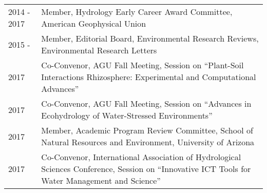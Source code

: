 
\begin{supertabular}{lp{15cm}} 
2014 - 2017 & Member, Hydrology Early Career Award Committee, American Geophysical Union \\
2015 -  & Member, Editorial Board, Environmental Research Reviews, Environmental Research Letters \\
2017 & Co-Convenor, AGU Fall Meeting, Session on ``Plant-Soil Interactions Rhizosphere: Experimental and Computational Advances'' \\
2017 & Co-Convenor, AGU Fall Meeting, Session on ``Advances in Ecohydrology of Water-Stressed Environments'' \\
2017 & Member, Academic Program Review Committee, School of Natural Resources and Environment, University of Arizona \\
2017 & Co-Convenor, International Association of Hydrological Sciences Conference, Session on ``Innovative ICT Tools for Water Management and Science'' \\
\end{supertabular}

